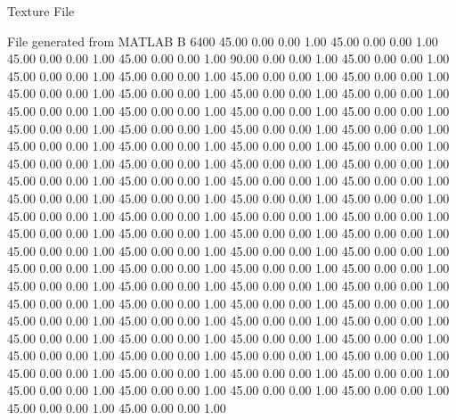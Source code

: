 Texture File

File generated from MATLAB
B 6400
   45.00   0.00   0.00   1.00
   45.00   0.00   0.00   1.00
   45.00   0.00   0.00   1.00
   45.00   0.00   0.00   1.00
   90.00   0.00   0.00   1.00
   45.00   0.00   0.00   1.00
   45.00   0.00   0.00   1.00
   45.00   0.00   0.00   1.00
   45.00   0.00   0.00   1.00
   45.00   0.00   0.00   1.00
   45.00   0.00   0.00   1.00
   45.00   0.00   0.00   1.00
   45.00   0.00   0.00   1.00
   45.00   0.00   0.00   1.00
   45.00   0.00   0.00   1.00
   45.00   0.00   0.00   1.00
   45.00   0.00   0.00   1.00
   45.00   0.00   0.00   1.00
   45.00   0.00   0.00   1.00
   45.00   0.00   0.00   1.00
   45.00   0.00   0.00   1.00
   45.00   0.00   0.00   1.00
   45.00   0.00   0.00   1.00
   45.00   0.00   0.00   1.00
   45.00   0.00   0.00   1.00
   45.00   0.00   0.00   1.00
   45.00   0.00   0.00   1.00
   45.00   0.00   0.00   1.00
   45.00   0.00   0.00   1.00
   45.00   0.00   0.00   1.00
   45.00   0.00   0.00   1.00
   45.00   0.00   0.00   1.00
   45.00   0.00   0.00   1.00
   45.00   0.00   0.00   1.00
   45.00   0.00   0.00   1.00
   45.00   0.00   0.00   1.00
   45.00   0.00   0.00   1.00
   45.00   0.00   0.00   1.00
   45.00   0.00   0.00   1.00
   45.00   0.00   0.00   1.00
   45.00   0.00   0.00   1.00
   45.00   0.00   0.00   1.00
   45.00   0.00   0.00   1.00
   45.00   0.00   0.00   1.00
   45.00   0.00   0.00   1.00
   45.00   0.00   0.00   1.00
   45.00   0.00   0.00   1.00
   45.00   0.00   0.00   1.00
   45.00   0.00   0.00   1.00
   45.00   0.00   0.00   1.00
   45.00   0.00   0.00   1.00
   45.00   0.00   0.00   1.00
   45.00   0.00   0.00   1.00
   45.00   0.00   0.00   1.00
   45.00   0.00   0.00   1.00
   45.00   0.00   0.00   1.00
   45.00   0.00   0.00   1.00
   45.00   0.00   0.00   1.00
   45.00   0.00   0.00   1.00
   45.00   0.00   0.00   1.00
   45.00   0.00   0.00   1.00
   45.00   0.00   0.00   1.00
   45.00   0.00   0.00   1.00
   45.00   0.00   0.00   1.00
   45.00   0.00   0.00   1.00
   45.00   0.00   0.00   1.00
   45.00   0.00   0.00   1.00
   45.00   0.00   0.00   1.00
   45.00   0.00   0.00   1.00
   45.00   0.00   0.00   1.00
   45.00   0.00   0.00   1.00
   45.00   0.00   0.00   1.00
   45.00   0.00   0.00   1.00
   45.00   0.00   0.00   1.00
   45.00   0.00   0.00   1.00
   45.00   0.00   0.00   1.00
   45.00   0.00   0.00   1.00
   45.00   0.00   0.00   1.00
   45.00   0.00   0.00   1.00
   45.00   0.00   0.00   1.00
   45.00   0.00   0.00   1.00
   45.00   0.00   0.00   1.00
   45.00   0.00   0.00   1.00
   45.00   0.00   0.00   1.00
